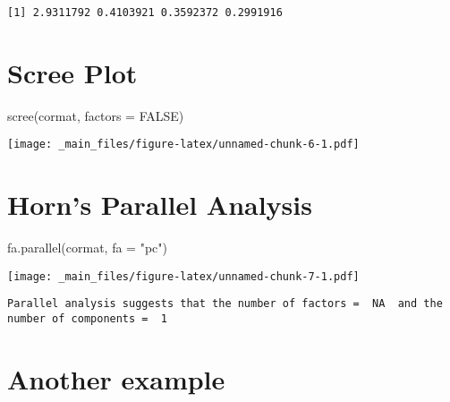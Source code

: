 \documentclass[
]{book}
\newenvironment{Shaded}{\begin{snugshade}}{\end{snugshade}}
\newcommand{\AttributeTok}[1]{\textcolor[rgb]{0.77,0.63,0.00}{#1}}
\newcommand{\ConstantTok}[1]{\textcolor[rgb]{0.00,0.00,0.00}{#1}}
\newcommand{\FunctionTok}[1]{\textcolor[rgb]{0.00,0.00,0.00}{#1}}
\newcommand{\NormalTok}[1]{#1}
\newcommand{\SpecialCharTok}[1]{\textcolor[rgb]{0.00,0.00,0.00}{#1}}
\newcommand{\StringTok}[1]{\textcolor[rgb]{0.31,0.60,0.02}{#1}}
\begin{document}
\begin{verbatim}
[1] 2.9311792 0.4103921 0.3592372 0.2991916
\end{verbatim}

\hypertarget{scree-plot}{%
\section{Scree Plot}\label{scree-plot}}

\begin{Shaded}
\begin{Highlighting}[]
\FunctionTok{scree}\NormalTok{(cormat, }\AttributeTok{factors =} \ConstantTok{FALSE}\NormalTok{)}
\end{Highlighting}
\end{Shaded}

\texttt{[image: \_main\_files/figure-latex/unnamed-chunk-6-1.pdf]}

\hypertarget{horns-parallel-analysis}{%
\section{Horn's Parallel Analysis}\label{horns-parallel-analysis}}

\begin{Shaded}
\begin{Highlighting}[]
\FunctionTok{fa.parallel}\NormalTok{(cormat, }\AttributeTok{fa =} \StringTok{"pc"}\NormalTok{)}
\end{Highlighting}
\end{Shaded}

\texttt{[image: \_main\_files/figure-latex/unnamed-chunk-7-1.pdf]}

\begin{verbatim}
Parallel analysis suggests that the number of factors =  NA  and the number of components =  1 
\end{verbatim}

\hypertarget{another-example}{%
\section{Another example}\label{another-example}}

\begin{Shaded}
\end{Shaded}
\end{document}
